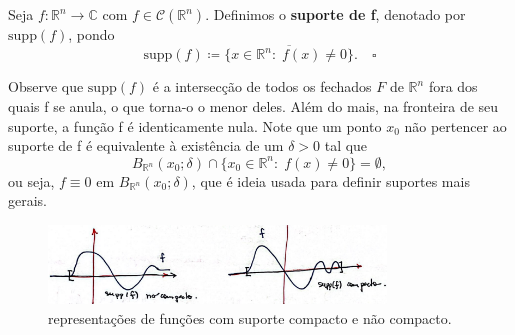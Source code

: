 \documentclass[../distribution_theory_notes.tex]{subfiles}
\begin{document}
\begin{def*}
	Seja \(f:\mathbb{R}^{n}\rightarrow \mathbb{C}\) com \(f\in \mathcal{C}(\mathbb{R}^{n})\). Definimos o \textbf{suporte de f}, denotado por \(\mathrm{supp}(f)\), pondo
	\[
		\mathrm{supp}(f)\coloneqq \overline{\{x\in \mathbb{R}^{n}:\; f(x)\neq 0\}}. \quad \square
	\]
\end{def*}
Observe que \(\mathrm{supp}(f)\) é a intersecção de todos os fechados \(F\) de \(\mathbb{R}^{n}\) fora dos quais f se anula, o que torna-o o menor deles. Além do mais, na fronteira de seu suporte, a função f é identicamente nula. Note que um ponto \(x_{0}\) não pertencer ao suporte de f é equivalente à existência de um \(\delta > 0\) tal que
\[
	B_{\mathbb{R}^{n}}(x_{0}; \delta )\cap \{x_{0}\in \mathbb{R}^{n}:\; f(x)\neq 0\}= \emptyset,
\]
ou seja, \(f\equiv 0\) em \(B_{\mathbb{R}^{n}}(x_{0}; \delta )\), que é ideia usada para definir suportes mais gerais.
\begin{figure}[H]
	\begin{center}
		\includegraphics[height=0.8\textheight, width=0.8\textwidth, keepaspectratio]{./Images/support_types_04.png}
	\end{center}
	\caption{representações de funções com suporte compacto e não compacto.}
\end{figure}
\end{document}
